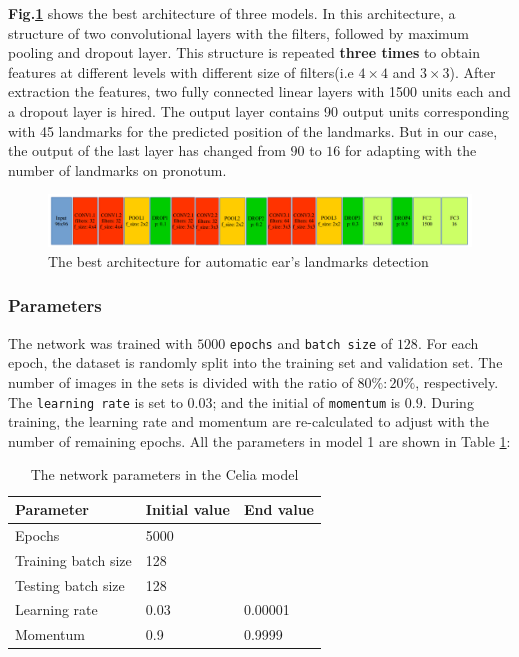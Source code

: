 \documentclass[12pt,a4paper]{article}
\begin{document}
\textbf{Fig.\ref{1Econv}} shows the best architecture of three models. In this architecture, a structure of two convolutional layers with the filters, followed by maximum pooling and dropout layer. This structure is repeated \textbf{three times} to obtain features at different levels with different size of filters(i.e $4 \times 4$ and $3 \times 3$). After extraction the features, two fully connected linear layers with 1500 units each and a dropout layer is hired. The output layer contains 90 output units corresponding with 45 landmarks for the predicted position of the landmarks. But in our case, the output of the last layer has changed from $90$ to $16$ for adapting with the number of landmarks on pronotum.
\begin{figure}[h!]
	\centering
	\includegraphics[scale=0.45]{images/ear_cnn2}
	\caption{The best architecture for automatic ear's landmarks detection}
	\label{1Econv}
\end{figure}
\subsubsection{Parameters}
The network was trained with $5000$ \texttt{epochs} and \texttt{batch size} of $128$. For each epoch, the dataset is randomly split into the training set and validation set. The number of images in the sets is divided with the ratio of $80\%:20\%$, respectively. The \texttt{learning rate} is set to $0.03$; and the initial of \texttt{momentum} is $0.9$. During training, the learning rate and momentum are re-calculated to adjust with the number of remaining epochs. All the parameters in model 1 are shown in Table \ref{celiaparameters}:
\begin{table}[h!]
	\centering
	\begin{tabular}{l l l}
	Parameter & Initial value & End value \\ \hline
	Epochs & 5000 &  \\ \hline
	Training batch size & 128 & \\ \hline
	Testing batch size & 128 & \\ \hline
	Learning rate & 0.03 & 0.00001 \\ \hline
	Momentum & 0.9 & 0.9999 \\ \hline
	\end{tabular}
	\caption{The network parameters in the Celia model}
	\label{celiaparameters}
\end{table}
\end{document}
